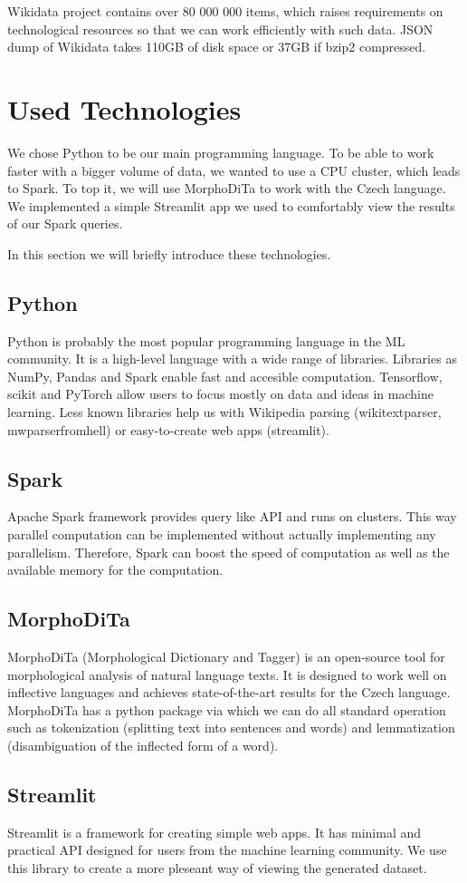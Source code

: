 Wikidata project contains over 80 000 000 items, which raises requirements on technological resources so that we can work efficiently with such data. JSON dump of Wikidata takes 110GB of disk space or 37GB if bzip2 compressed.



\section{Used Technologies}
We chose Python to be our main programming language. To be able to work faster with a bigger volume of data, we wanted to use a CPU cluster, which leads to Spark. To top it, we will use MorphoDiTa to work with the Czech language. We implemented a simple Streamlit app we used to comfortably view the results of our Spark queries.

In this section we will briefly introduce these technologies.

\subsection{Python}
Python is probably the most popular programming language in the ML community. It is a high-level language with a wide range of libraries. Libraries as NumPy, Pandas and Spark enable fast and accesible computation. Tensorflow, scikit and PyTorch allow users to focus mostly on data and ideas in machine learning. Less known libraries help us with Wikipedia parsing (wikitextparser, mwparserfromhell) or easy-to-create web apps (streamlit).

\subsection{Spark}
Apache Spark framework provides query like API and runs on clusters. This way parallel computation can be implemented without actually implementing any parallelism. Therefore, Spark can boost the speed of computation as well as the available memory for the computation.


\subsection{MorphoDiTa}

MorphoDiTa \cite{Morphodita} (Morphological Dictionary and Tagger) is an open-source tool for morphological analysis of natural language texts. It is designed to work well on inflective languages and achieves state-of-the-art results for the Czech language. MorphoDiTa has a python package via which we can do all standard operation such as tokenization (splitting text into sentences and words) and lemmatization (disambiguation of the inflected form of a word).

\subsection{Streamlit}
Streamlit is a framework for creating simple web apps. It has minimal and practical API designed for users from the machine learning community. We use this library to create a more pleseant way of viewing the generated dataset.





